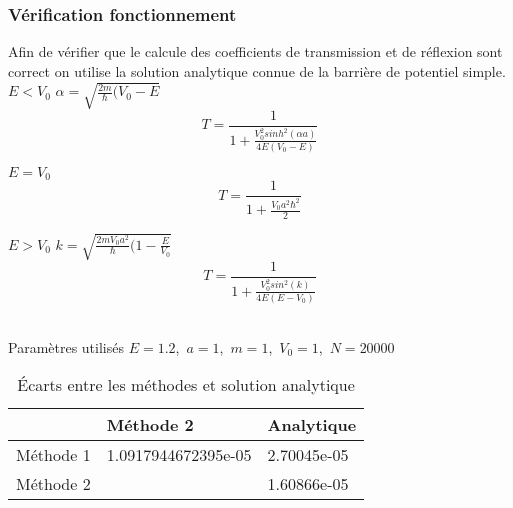 \subsubsection{Vérification fonctionnement}

Afin de vérifier que le calcule des coefficients de transmission et de réflexion sont correct on utilise la solution analytique connue \cite{antoine2022introduction}{}de la barrière de potentiel simple. 
\newpage 
$E<V_{0}$
\qquad
$\alpha=\sqrt{\frac{2m}{\hbar}(V_{0}-E}$
\begin{equation} \label{eq:analityquee<v}
T=\frac{1}{1+\frac{V_{0}^{2}sinh^{2}(\alpha a)}{4E(V_{0}-E)}}
\end{equation}

$E=V_{0}$
\begin{equation} \label{eq:analityquee=v}
T=\frac{1}{1+\frac{V_{0}a^{2}\hbar^{2}}{2}}
\end{equation}

$E>V_{0}$
\qquad
$k=\sqrt{\frac{2mV_{0}a^{2}}{\hbar}(1-\frac{E}{V_{0}}}$
\begin{equation} \label{eq:analityquee>v}
T=\frac{1}{1+\frac{V_{0}^{2}sin^{2}(k)}{4E(E-V_{0})}}
\end{equation}
\\

\begin{table}[!ht]
\centering
Paramètres utilisés $E=1.2$,\ $a=1$,\ $m=1$,\ $V_{0}=1$,\ $N=20000$\\
\begin{tabular}{|l|l|l|}
\hline   & Méthode 2 & Analytique  \\
\hline  Méthode 1 &   1.0917944672395e-05 & 2.70045e-05 \\
\hline Méthode 2 &   &1.60866e-05\\ 
\hline
\end{tabular}
\caption{Écarts entre les méthodes et solution analytique}
\label{tab2}
\end{table}